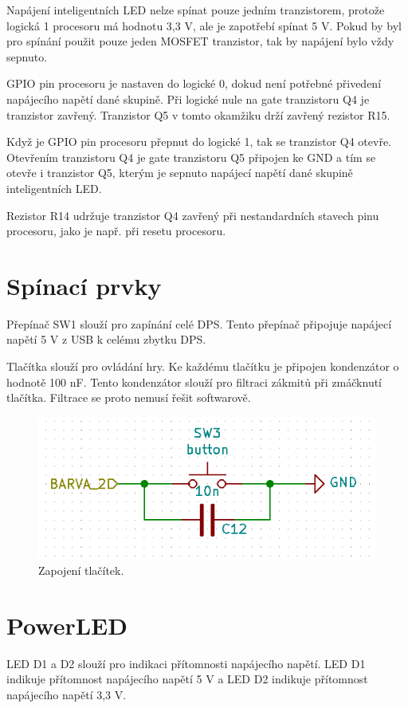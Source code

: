 Napájení inteligentních LED nelze spínat pouze jedním tranzistorem, protože logická 1 procesoru má hodnotu 3,3 V, ale je 
zapotřebí spínat 5 V. Pokud by byl pro spínání použit pouze jeden MOSFET tranzistor, tak by napájení bylo vždy sepnuto.

GPIO pin procesoru je nastaven do logické 0, dokud není potřebné přivedení napájecího napětí dané skupině. 
Při logické nule na gate 
tranzistoru Q4 je tranzistor zavřený. Tranzistor Q5 v tomto okamžiku drží zavřený rezistor R15.

Když je GPIO pin procesoru přepnut do logické 1, tak se tranzistor Q4 otevře. Otevřením tranzistoru Q4 je gate tranzistoru Q5 
připojen ke GND a tím se otevře i tranzistor Q5, kterým je sepnuto napájecí napětí dané skupině inteligentních LED.

Rezistor R14 udržuje tranzistor Q4 zavřený při nestandardních stavech pinu procesoru, jako je např. při resetu procesoru.

\section{Spínací prvky}
Přepínač SW1 slouží pro zapínání celé DPS. Tento přepínač připojuje napájecí napětí 5 V z USB k celému zbytku DPS.

Tlačítka slouží pro ovládání hry. Ke každému tlačítku je připojen kondenzátor o hodnotě 100 nF. Tento kondenzátor 
slouží pro filtraci zákmitů při zmáčknutí tlačítka. Filtrace se proto nemusí řešit softwarově.

\begin{figure}[!h]
  \begin{center}
    \includegraphics[scale=0.8]{obrazky/Tlacitka_zapojeni.png}
  \end{center}
  \caption[Zapojení tlačítek]{Zapojení tlačítek.}
\end{figure}

\section{PowerLED}
LED D1 a D2 slouží pro indikaci přítomnosti napájecího napětí.  LED D1 indikuje přítomnost napájecího napětí 
5 V a LED D2 indikuje přítomnost napájecího napětí 3,3 V.

